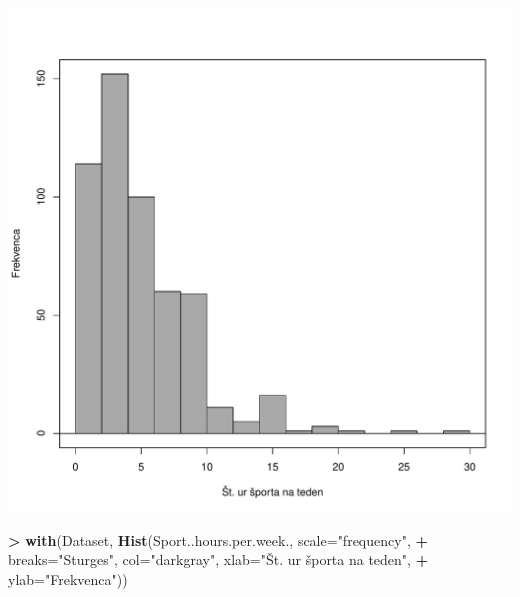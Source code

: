 \documentclass[
]{article}
\newenvironment{Shaded}{\begin{snugshade}}{\end{snugshade}}
\newcommand{\AttributeTok}[1]{\textcolor[rgb]{0.13,0.29,0.53}{#1}}
\newcommand{\FunctionTok}[1]{\textcolor[rgb]{0.13,0.29,0.53}{\textbf{#1}}}
\newcommand{\NormalTok}[1]{#1}
\newcommand{\SpecialCharTok}[1]{\textcolor[rgb]{0.81,0.36,0.00}{\textbf{#1}}}
\newcommand{\StringTok}[1]{\textcolor[rgb]{0.31,0.60,0.02}{#1}}
\begin{document}
\includegraphics[width=750px]{RcmdrMarkdown_files/figure-latex/unnamed-chunk-10-1}

\begin{Shaded}
\begin{Highlighting}[]
\SpecialCharTok{\textgreater{}} \FunctionTok{with}\NormalTok{(Dataset, }\FunctionTok{Hist}\NormalTok{(Sport..hours.per.week., }\AttributeTok{scale=}\StringTok{"frequency"}\NormalTok{,}
\SpecialCharTok{+} \AttributeTok{breaks=}\StringTok{"Sturges"}\NormalTok{, }\AttributeTok{col=}\StringTok{"darkgray"}\NormalTok{, }\AttributeTok{xlab=}\StringTok{"Št. ur športa na teden"}\NormalTok{,}
\SpecialCharTok{+} \AttributeTok{ylab=}\StringTok{"Frekvenca"}\NormalTok{))}
\end{Highlighting}
\end{Shaded}
\end{document}
